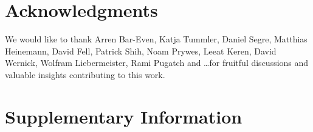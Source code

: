 \documentclass[a4page,notitlepage]{article}
\begin{document}
\section{Acknowledgments}
We would like to thank Arren Bar-Even, Katja Tummler, Daniel Segre, Matthias Heinemann, David Fell, Patrick Shih, Noam Prywes, Leeat Keren, David Wernick, Wolfram Liebermeister, Rami Pugatch and \dots for fruitful discussions and valuable insights contributing to this work.
{}

\section{Supplementary Information}
\beginsupplement

\end{document}
